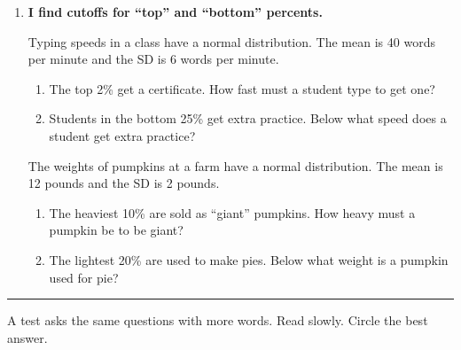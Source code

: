 \documentclass[11pt]{article}
\newcommand{\lessonhead}[1]{\par\vspace{0.6em}{\large\bfseries #1}\par\vspace{0.25em}\hrule\vspace{0.6em}}
\newcommand{\goal}[1]{\textbf{#1}\par\vspace{0.35em}}
\begin{document}
\begin{enumerate}[resume]
\item \goal{I find cutoffs for ``top'' and ``bottom'' percents.}
Typing speeds in a class have a normal distribution. The mean is 40 words per minute and the SD is 6 words per minute.
\begin{enumerate}[itemsep=1em]
  \item The top 2\% get a certificate. How fast must a student type to get one?

  \work{3em}
  \item Students in the bottom 25\% get extra practice. Below what speed does a student get extra practice?

  \work{3em}
\end{enumerate}

\vspace{0.6em}
The weights of pumpkins at a farm have a normal distribution. The mean is 12 pounds and the SD is 2 pounds.
\begin{enumerate}[start=3,itemsep=1em]
  \item The heaviest 10\% are sold as ``giant'' pumpkins. How heavy must a pumpkin be to be giant?

  \work{3em}
  \item The lightest 20\% are used to make pies. Below what weight is a pumpkin used for pie?

  \work{3em}
\end{enumerate}

\end{enumerate}

\newpage
\lessonhead{Test-Style Questions}
A test asks the same questions with more words. Read slowly. Circle the best answer.
\end{document}
